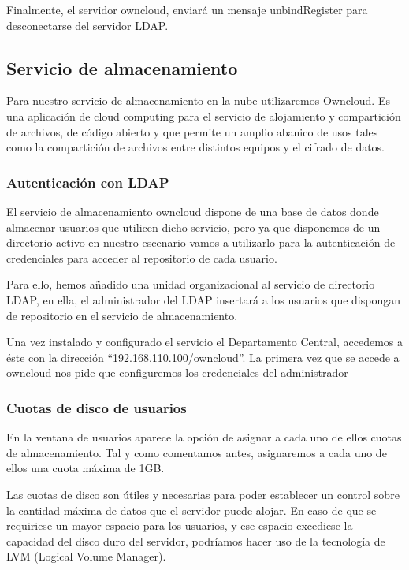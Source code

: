 \documentclass[a4paper]{article}
\begin{document}

Finalmente, el servidor owncloud, enviará un mensaje unbindRegister para desconectarse del servidor LDAP.


\subsection{Servicio de almacenamiento}
Para nuestro servicio de almacenamiento en la nube utilizaremos Owncloud. Es una aplicación de cloud computing para el servicio de alojamiento y compartición de archivos, de código abierto y que permite un amplio abanico de usos tales como la
compartición de archivos entre distintos equipos y el cifrado de datos.

\subsubsection{Autenticación con LDAP}
El servicio de almacenamiento owncloud dispone de una base de datos donde almacenar usuarios que utilicen dicho servicio, pero ya que disponemos de un directorio activo en nuestro escenario vamos a utilizarlo para la autenticación de credenciales para acceder al repositorio de cada usuario.

Para ello, hemos añadido una unidad organizacional al servicio de directorio LDAP, en ella, el administrador del LDAP insertará a los usuarios que dispongan de repositorio en el servicio de almacenamiento.

Una vez instalado y configurado el servicio el Departamento Central, accedemos a éste con la dirección ``192.168.110.100/owncloud''. La primera vez que se accede a owncloud nos pide que configuremos los credenciales del administrador


\subsubsection{Cuotas de disco de usuarios}
En la ventana de usuarios aparece la opción de asignar a cada uno de ellos cuotas de almacenamiento. Tal y como comentamos antes, asignaremos a cada uno de ellos una cuota máxima de 1GB.

Las cuotas de disco son útiles y necesarias para poder establecer un control sobre la cantidad máxima de datos que el servidor puede alojar. En caso de que se requiriese un mayor espacio para los usuarios, y ese espacio excediese la capacidad del disco duro del
servidor, podríamos hacer uso de la tecnología de LVM (Logical Volume Manager). 
\end{document}
